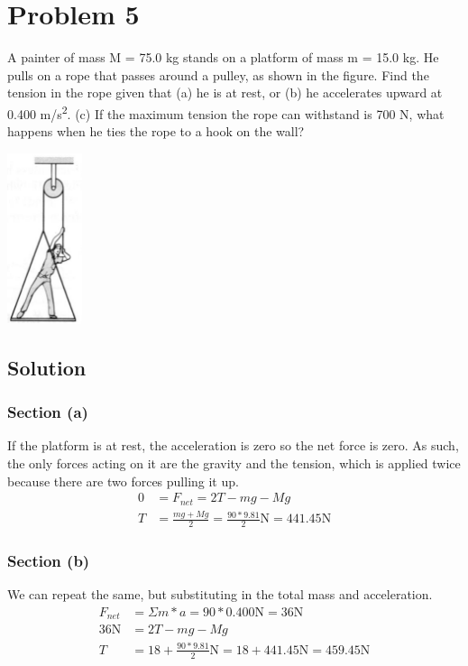 \documentclass[12pt]{article}
\begin{document}

\section*{Problem 5}
A painter of mass M = 75.0 kg stands on a platform of mass m = 15.0 kg. He pulls on a rope that passes around a pulley, as shown in the figure. Find the tension in the rope given that (a) he is at rest, or (b) he accelerates upward at 0.400 \unit{\meter/\second^2}. (c) If the maximum tension the rope can withstand is 700 N, what happens when he ties the rope to a hook on the wall?

\begin{center}
    \includegraphics*[height=5cm]{graph_5.png}
\end{center}

\subsection*{Solution}
\subsubsection*{Section (a)}
If the platform is at rest, the acceleration is zero so the net force is zero. As such, the only forces acting on it are the gravity and the tension, which is applied twice because there are two forces pulling it up.
\begin{align*}
    0 &= F_{net} = 2T - mg - Mg\\
    T &= \frac{mg + Mg}{2} = \frac{90*9.81}{2}\unit{\newton} = \boxed{441.45 \unit{\newton}}
\end{align*}

\subsubsection*{Section (b)}
We can repeat the same, but substituting in the total mass and acceleration.
\begin{align*}
    F_{net} &= \Sigma m * a = 90 * 0.400 \unit{\newton} = 36 \unit{\newton}\\
    36 \unit{\newton} &= 2T - mg - Mg\\
    T &= 18 + \frac{90*9.81}{2} \unit{\newton} 
        = 18 + 441.45 \unit{\newton} 
        = \boxed{459.45 \unit{\newton}}
\end{align*}
\end{document}
